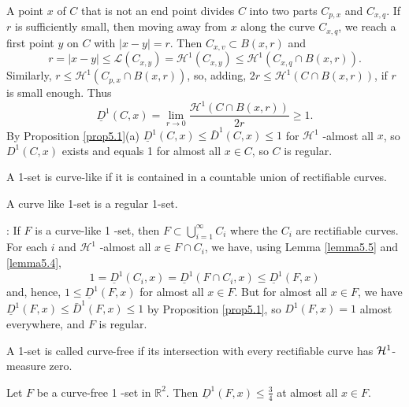 A point $x$ of $C$ that is not an end point divides $C$ into two parts $C_{p, x}$ and $C_{x, q} .$ If $r$ is sufficiently small, then moving away from $x$ along the curve $C_{x, q}$, we reach a first point $y$ on $C$ with $|x-y|=r$. Then $C_{x, v} \subset B(x, r)$ and
$$
r=|x-y| \leq \mathcal{L}\left(C_{x, y}\right)=\mathcal{H}^{1}\left(C_{x, y}\right) \leq \mathcal{H}^{1}\left(C_{x, q} \cap B(x, r)\right) .
$$
Similarly, $r \leq \mathcal{H}^{1}\left(C_{p, x} \cap B(x, r)\right)$, so, adding, $2 r \leq \mathcal{H}^{1}(C \cap B(x, r))$, if $r$ is
small enough. Thus
$$
\underline{D}^{1}(C, x)=\lim _{r \rightarrow 0} \frac{\mathcal{H}^{1}(C \cap B(x, r))}{2 r} \geq 1 .
$$
By Proposition \ref{prop5.1}(a) $\underline{D}^{1}(C, x) \leq \bar{D}^{1}(C, x) \leq 1$ for $\mathcal{H}^{1}$ -almost all $x$, so
$D^{1}(C, x)$ exists and equals 1 for almost all $x \in C$, so $C$ is regular.


\begin{definition}
    A 1-set is curve-like if it is contained in a countable union of rectifiable curves.
\end{definition}

\begin{proposition}\label{prop5.6}
    A curve like 1-set is a regular 1-set. 
\end{proposition}
\proof: If $F$ is a curve-like 1 -set, then $F \subset \bigcup_{i=1}^{\infty} C_{i}$ where the $C_{i}$ are rectifiable curves. For each $i$ and $\mathcal{H}^{1}$ -almost all $x \in F \cap C_{i}$, we have, using Lemma \ref{lemma5.5} and \ref{lemma5.4},
$$
1=\underline{D}^{1}\left(C_{i}, x\right)=\underline{D}^{1}\left(F \cap C_{i}, x\right) \leq \underline{D}^{1}(F, x)
$$
and, hence, $1 \leq \underline{D}^{1}(F, x)$ for almost all $x \in F$. But for almost all $x \in F$, we have $\underline{D}^{1}(F, x) \leq \bar{D}^{1}(F, x) \leq 1$ by Proposition \ref{prop5.1}, so
$D^{1}(F, x)=1$ almost everywhere, and $F$ is regular.

\begin{definition}
    A 1-set is called curve-free if its intersection with every rectifiable curve has $\mathcal{H}^1$-measure zero. 
\end{definition}


\begin{proposition}Let $F$ be a curve-free 1 -set in $\mathbb{R}^{2}$. Then $\underline{D}^{1}(F, x) \leq \frac{3}{4}$ at almost all $x \in F .$
\end{proposition}


